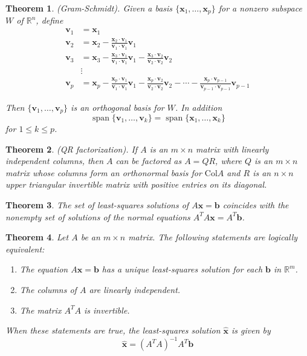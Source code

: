 \documentclass{article}
\theoremstyle{plain}
\newtheorem{thm}{Theorem}[section]
\theoremstyle{definition}
\theoremstyle{remark}
\DeclareMathOperator{\spn}{span}
\begin{document}
\begin{thm} (Gram-Schmidt).
    Given a basis \(\{\textbf{x}_1,\ldots,\textbf{x}_p\}\) for a nonzero subspace \(W\) of \(\mathbb{R}^n\), define \begin{align*}
    \textbf{v}_1&=\textbf{x}_1\\
    \textbf{v}_2&=\textbf{x}_2-\frac{\textbf{x}_2\cdot\textbf{v}_1}{\textbf{v}_1\cdot\textbf{v}_1}\textbf{v}_1\\
    \textbf{v}_3&=\textbf{x}_3-\frac{\textbf{x}_3\cdot\textbf{v}_1}{\textbf{v}_1\cdot\textbf{v}_1}\textbf{v}_1-\frac{\textbf{x}_3\cdot\textbf{v}_2}{\textbf{v}_2\cdot\textbf{v}_2}\textbf{v}_2\\
    &\vdots\\
    \textbf{v}_p&=\textbf{x}_p-\frac{\textbf{x}_p\cdot\textbf{v}_1}{\textbf{v}_1\cdot\textbf{v}_1}\textbf{v}_1-\frac{\textbf{x}_p\cdot\textbf{v}_2}{\textbf{v}_2\cdot\textbf{v}_2}\textbf{v}_2-\cdots-\frac{\textbf{x}_p\cdot\textbf{v}_{p-1}}{\textbf{v}_{p-1}\cdot\textbf{v}_{p-1}}\textbf{v}_{p-1}
\end{align*}

    Then \(\{\textbf{v}_1,\ldots,\textbf{v}_p\}\) is an orthogonal basis for \(W\). In addition \[\spn\{\textbf{v}_1,\ldots,\textbf{v}_k\}=\spn\{\textbf{x}_1,\ldots,\textbf{x}_k\}\]\hspace{.5cm} for \(1\leq k\leq p\).
\end{thm}

\begin{thm} (QR factorization).
    If \(A\) is an \(m\times n\) matrix with linearly independent columns, then \(A\) can be factored as \(A=QR\), where \(Q\) is an \(m\times n\) matrix whose columns form an orthonormal basis for \(\text{Col}A\) and \(R\) is an \(n\times n\) upper triangular invertible matrix with positive entries on its diagonal.
\end{thm}

\begin{thm}
    The set of least-squares solutions of \(A\textbf{x}=\textbf{b}\) coincides with the nonempty set of solutions of the normal equations \(A^TA\textbf{x}=A^T\textbf{b}\).
\end{thm}

\begin{thm}
    Let \(A\) be an \(m\times n\) matrix. The following statements are logically equivalent:
    \begin{enumerate}
        \item[a.] The equation \(A\textbf{x}=\textbf{b}\) has a unique least-squares solution for each \(\textbf{b}\) in \(\mathbb{R}^m\).
        \item[b.] The columns of \(A\) are linearly independent.
        \item[c.] The matrix \(A^TA\) is invertible.
    \end{enumerate}
When these statements are true, the least-squares solution \(\hat{\textbf{x}}\) is given by \[\hat{\textbf{x}}=(A^TA)^{-1}A^T\textbf{b}\]
\end{thm}
\end{document}
